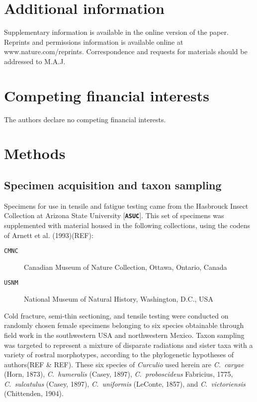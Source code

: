 \documentclass[twocolumn, linenumbers, superscriptaddress, nofootinbib]{revtex4-1}
\begin{document}
	\section*{Additional information}
		Supplementary information is available in the online version of the paper.
		Reprints and permissions information is available online at www.nature.com/reprints.
		Correspondence and requests for materials should be addressed to M.A.J.
	
	\section*{Competing financial interests}
		The authors declare no competing financial interests.
	
	\newpage

	\section*{Methods}
		\subsection*{Specimen acquisition and taxon sampling}
			Specimens for use in tensile and fatigue testing came from the Hasbrouck Insect Collection at Arizona State University [\textbf{\texttt{ASUC}}].  This set of specimens was supplemented with material housed in the following collections, using the codens of Arnett	et al. (1993)(REF):
			
			\begin{description}
				\item [\texttt{CMNC}]  Canadian Museum of Nature Collection, Ottawa, Ontario, Canada
				\item [\texttt{USNM}]  National Museum of Natural History, Washington, D.C., USA
			\end{description}
		
			Cold fracture, semi-thin sectioning, and tensile testing were conducted on randomly chosen female specimens belonging to six species obtainable through field work in the southwestern USA and northwestern Mexico.
			Taxon sampling was targeted to represent a mixture of disparate radiations and sister taxa with a variety of rostral morphotypes, according to the phylogenetic hypotheses of authors(REF \& REF).
			These six species of \textit{Curculio} used herein are \textit{C.~caryae} (Horn, 1873), \textit{C.~humeralis} (Casey, 1897), \textit{C.~proboscideus} Fabricius, 1775, \textit{C.~sulcatulus} (Casey, 1897), \textit{C.~uniformis} (LeConte, 1857), and \textit{C.~victoriensis} (Chittenden, 1904).
	
\end{document}
